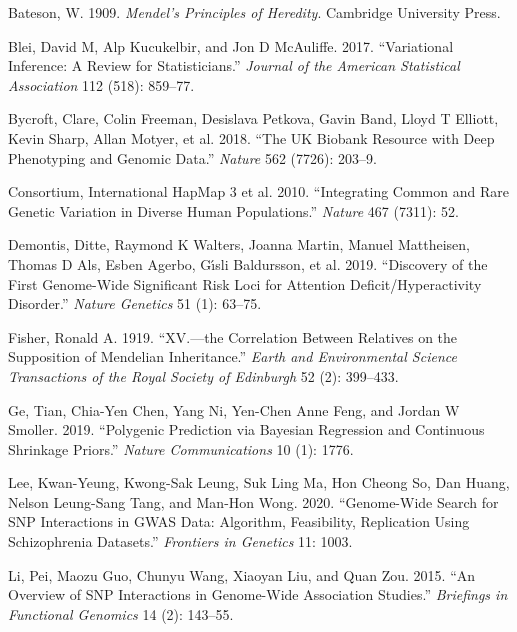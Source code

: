 \documentclass[
  11pt,
  letterpaper,
  DIV=11,
  numbers=noendperiod]{scrartcl}
\newlength{\cslhangindent}
\newlength{\cslentryspacingunit} %
\newenvironment{CSLReferences}[2] %
 {%
  \setlength{\parindent}{0pt}
  \ifodd #1
  \let\oldpar\par
  \def\par{\hangindent=\cslhangindent\oldpar}
  \fi
  \setlength{\parskip}{#2\cslentryspacingunit}
 }%
 {}
\begin{document}
\hypertarget{refs}{}
\begin{CSLReferences}{1}{0}
\leavevmode{}%
Bateson, W. 1909. \emph{Mendel's Principles of Heredity}. Cambridge
University Press.

\leavevmode{}%
Blei, David M, Alp Kucukelbir, and Jon D McAuliffe. 2017. {``Variational
Inference: A Review for Statisticians.''} \emph{Journal of the American
Statistical Association} 112 (518): 859--77.

\leavevmode{}%
Bycroft, Clare, Colin Freeman, Desislava Petkova, Gavin Band, Lloyd T
Elliott, Kevin Sharp, Allan Motyer, et al. 2018. {``The UK Biobank
Resource with Deep Phenotyping and Genomic Data.''} \emph{Nature} 562
(7726): 203--9.

\leavevmode{}%
Consortium, International HapMap 3 et al. 2010. {``Integrating Common
and Rare Genetic Variation in Diverse Human Populations.''}
\emph{Nature} 467 (7311): 52.

\leavevmode{}%
Demontis, Ditte, Raymond K Walters, Joanna Martin, Manuel Mattheisen,
Thomas D Als, Esben Agerbo, Gı́sli Baldursson, et al. 2019. {``Discovery
of the First Genome-Wide Significant Risk Loci for Attention
Deficit/Hyperactivity Disorder.''} \emph{Nature Genetics} 51 (1):
63--75.

\leavevmode{}%
Fisher, Ronald A. 1919. {``XV.---the Correlation Between Relatives on
the Supposition of Mendelian Inheritance.''} \emph{Earth and
Environmental Science Transactions of the Royal Society of Edinburgh} 52
(2): 399--433.

\leavevmode{}%
Ge, Tian, Chia-Yen Chen, Yang Ni, Yen-Chen Anne Feng, and Jordan W
Smoller. 2019. {``Polygenic Prediction via Bayesian Regression and
Continuous Shrinkage Priors.''} \emph{Nature Communications} 10 (1):
1776.

\leavevmode{}%
Lee, Kwan-Yeung, Kwong-Sak Leung, Suk Ling Ma, Hon Cheong So, Dan Huang,
Nelson Leung-Sang Tang, and Man-Hon Wong. 2020. {``Genome-Wide Search
for SNP Interactions in GWAS Data: Algorithm, Feasibility, Replication
Using Schizophrenia Datasets.''} \emph{Frontiers in Genetics} 11: 1003.

\leavevmode{}%
Li, Pei, Maozu Guo, Chunyu Wang, Xiaoyan Liu, and Quan Zou. 2015. {``An
Overview of SNP Interactions in Genome-Wide Association Studies.''}
\emph{Briefings in Functional Genomics} 14 (2): 143--55.


\end{CSLReferences}
\end{document}
